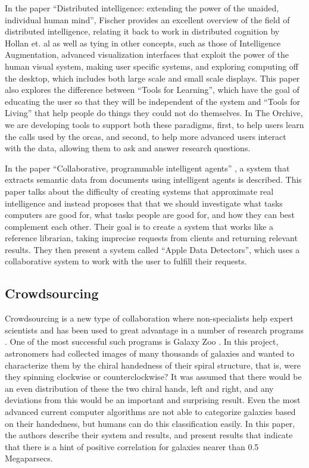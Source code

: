 In the paper ``Distributed intelligence: extending the power of the
unaided, individual human mind'', \cite{fischer06} Fischer provides an
excellent overview of the field of distributed intelligence, relating
it back to work in distributed cognition by Hollan et. al
\cite{hollan00} as well as tying in other concepts, such as those of
Intelligence Augmentation, advanced visualization interfaces that
exploit the power of the human visual system, making user specific
systems, and exploring computing off the desktop, which includes both
large scale and small scale displays.  This paper also explores the
difference between ``Tools for Learning'', which have the goal of
educating the user so that they will be independent of the system and
``Tools for Living'' that help people do things they could not do
themselves.  In The Orchive, we are developing tools to support both
these paradigms, first, to help users learn the calls used by the
orcas, and second, to help more advanced users interact with the data,
allowing them to ask and answer research questions. 

In the paper ``Collaborative, programmable intelligent agents''
\cite{nardi98}, a system that extracts semantic data from documents
using intelligent agents is described.  This paper talks about the
difficulty of creating systems that approximate real intelligence and
instead proposes that that we should investigate what tasks computers
are good for, what tasks people are good for, and how they can best
complement each other.  Their goal is to create a system that works
like a reference librarian, taking imprecise requests from clients and
returning relevant results.  They then present a system called ``Apple
Data Detectors'', which uses a collaborative system to work with the
user to fulfill their requests. 
 
\subsection{Crowdsourcing}

Crowdsourcing is a new type of collaboration where non-specialists
help expert scientists \cite{howe08_crowdsourcing} and has been used
to great advantage \cite{surowiecki05_crowdsourcing} in a number
\cite{bradham08_crowdsourcing} of research programs
\cite{travis08_crowdsourcing}.  One of the most successful such
programs is Galaxy Zoo \cite{anze08_galaxyzoo}.  In this project,
astronomers had collected images of many thousands of galaxies and
wanted to characterize them by the chiral handedness of their spiral
structure, that is, were they spinning clockwise or counterclockwise?
It was assumed that there would be an even distribution of these the
two chiral hands, left and right, and any deviations from this would
be an important and surprising result.  Even the most advanced current
computer algorithms are not able to categorize galaxies based on their
handedness, but humans can do this classification easily.  In this
paper, the authors describe their system and results, and present
results that indicate that there is a hint of positive correlation for
galaxies nearer than 0.5 Megaparsecs.

